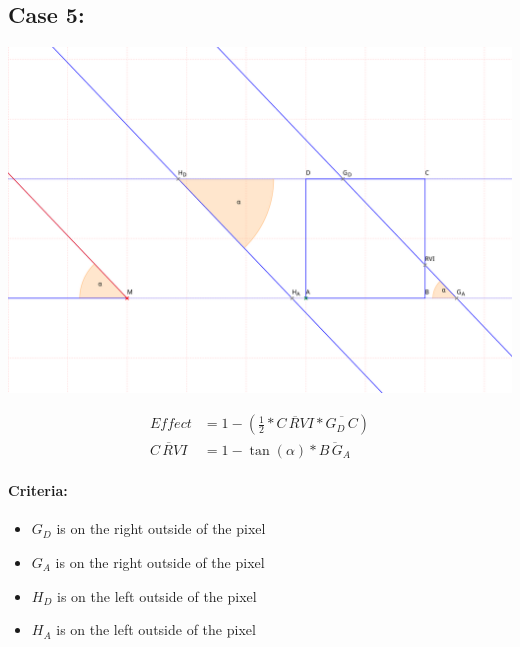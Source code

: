 \documentclass[a4paper,10pt,fleqn]{scrartcl}
\numberwithin{equation}{subsection}
\begin{document}
\subsection{Case 5:}
\begin{minipage}{\textwidth}
\includegraphics[width=\textwidth]{case3}
\end{minipage}
\begin{align}
Effect &= 1 - (\frac{1}{2} * \overline{C\,RVI} * \overline{G_D\,C})\\
\overline{C\,RVI} &=  1 - \tan(\alpha) * \overline{B\,G_A}
\end{align}
\paragraph{Criteria:}
\begin{itemize}
 \item $G_D$ is on the right outside of the pixel
 \item $G_A$ is on the right outside of the pixel
 \item $H_D$ is on the left outside of the pixel
 \item $H_A$ is on the left outside of the pixel
\end{itemize}
\end{document}
